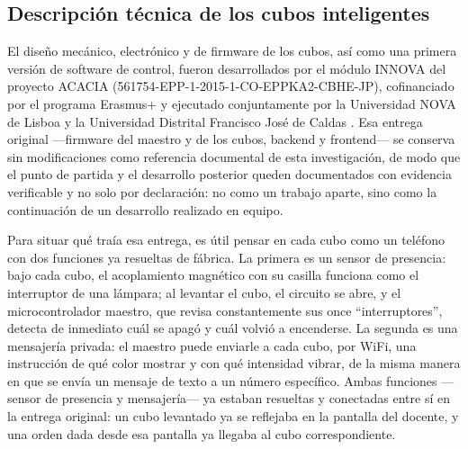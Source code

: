 \documentclass{book}
\begin{document}
\subsection{Descripción técnica de los cubos inteligentes}
El diseño mecánico, electrónico y de firmware de los cubos, así como una primera versión de software de control, fueron desarrollados por el módulo INNOVA del proyecto ACACIA (561754-EPP-1-2015-1-CO-EPPKA2-CBHE-JP), cofinanciado por el programa Erasmus+ y ejecutado conjuntamente por la Universidad NOVA de Lisboa y la Universidad Distrital Francisco José de Caldas \citep{ACACIA2025}. Esa entrega original —firmware del maestro y de los cubos, backend y frontend— se conserva sin modificaciones como referencia documental de esta investigación, de modo que el punto de partida y el desarrollo posterior queden documentados con evidencia verificable y no solo por declaración: no como un trabajo aparte, sino como la continuación de un desarrollo realizado en equipo.

Para situar qué traía esa entrega, es útil pensar en cada cubo como un teléfono con dos funciones ya resueltas de fábrica. La primera es un sensor de presencia: bajo cada cubo, el acoplamiento magnético con su casilla funciona como el interruptor de una lámpara; al levantar el cubo, el circuito se abre, y el microcontrolador maestro, que revisa constantemente sus once ``interruptores'', detecta de inmediato cuál se apagó y cuál volvió a encenderse. La segunda es una mensajería privada: el maestro puede enviarle a cada cubo, por WiFi, una instrucción de qué color mostrar y con qué intensidad vibrar, de la misma manera en que se envía un mensaje de texto a un número específico. Ambas funciones —sensor de presencia y mensajería— ya estaban resueltas y conectadas entre sí en la entrega original: un cubo levantado ya se reflejaba en la pantalla del docente, y una orden dada desde esa pantalla ya llegaba al cubo correspondiente.
\end{document}
